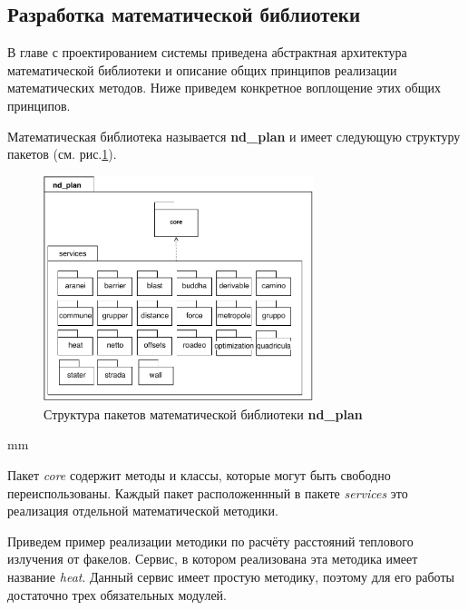 \subsection{\large{Разработка математической библиотеки}}

В главе с проектированием системы приведена абстрактная архитектура математической библиотеки
и описание общих принципов реализации математических методов. Ниже приведем конкретное воплощение этих общих принципов.

Математическая библиотека называется \textbf{nd\_plan} и имеет следующую структуру пакетов
(см. рис.\ref{pic:implementation__math-packages}).

\begin{figure}[H]
	\hspace*{-2.5 cm}\includegraphics[width=0.7\textwidth]{implementation/pictures/math/packages}
	\caption{Структура пакетов математической библиотеки \textbf{nd\_plan}}
	\label{pic:implementation__math-packages}
\end{figure}
 mm

Пакет \textit{core} содержит методы и классы, которые могут быть свободно переиспользованы.
Каждый пакет расположеннный в пакете \textit{services} это реализация отдельной математической методики.

Приведем пример реализации
методики по расчёту расстояний теплового излучения от факелов. Сервис, в котором реализована эта
методика имеет название \textit{heat}. Данный сервис имеет простую методику, поэтому для его работы достаточно
трех обязательных модулей.

